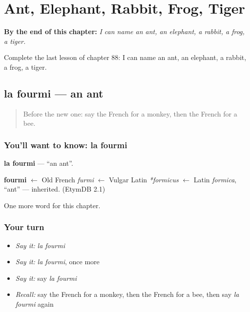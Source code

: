 
\chapter{Ant, Elephant, Rabbit, Frog, Tiger}
\label{ch:fr-ant-elephant-rabbit-frog-tiger}

\begin{chapteropening}
\textbf{By the end of this chapter:} \emph{I can name an ant, an elephant, a rabbit, a frog, a tiger.}

Complete the last lesson of chapter 88: I can name an ant, an elephant, a rabbit, a frog, a tiger.
\end{chapteropening}

\section[la fourmi]{la fourmi — an ant}

\label{lesson:FR-C88-fourmi}



\begin{quote}
Before the new one: say the French for a monkey, then the French for a bee.
\end{quote}

\subsection*{You'll want to know: la fourmi}
\textbf{la fourmi} — \textquotedblleft{}an ant\textquotedblright{}.

\begin{cousinweb}
\textbf{fourmi} $\leftarrow$ Old French \emph{furmi} $\leftarrow$ Vulgar Latin \emph{*formicus} $\leftarrow$ Latin \emph{formica}, \textquotedblleft{}ant\textquotedblright{} — inherited. (EtymDB 2.1)
\end{cousinweb}

\begin{grammarlens}[title={What you've built}]
One more word for this chapter.
\end{grammarlens}

\subsection*{Your turn}
\begin{itemize}
\raggedright
  \item \emph{Say it:} \emph{la fourmi}
  \item \emph{Say it:} \emph{la fourmi}, once more
  \item \emph{Say it:} say \emph{la fourmi}
  \item \emph{Recall:} say the French for a monkey, then the French for a bee, then say \emph{la fourmi} again
\end{itemize}


